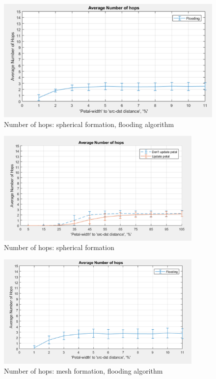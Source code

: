\begin{figure}[hbtp]
\centering
\includegraphics[width=1\textwidth]{ncsuthesis-0.6/Chapter-5/figs/fl_hops_spherical.png}
\caption{Number of hops: spherical formation, flooding algorithm}
\label{fig:fl_hops_spherical}
\end{figure}

\begin{figure}[hbtp]
\centering
\includegraphics[width=0.9\textwidth,height=0.9\textheight,keepaspectratio]{ncsuthesis-0.6/Chapter-5/figs/pe_hops_spherical.png}
\caption{Number of hops: spherical formation}
\label{fig:pe_hops_spherical}
\end{figure}

\begin{figure}[hbtp]
\centering
\includegraphics[width=0.9\textwidth,height=0.9\textheight,keepaspectratio]{ncsuthesis-0.6/Chapter-5/figs/fl_hop_random.png}
\caption{Number of hops: mesh formation, flooding algorithm}
\label{fig:fl_hops_random}
\end{figure}

